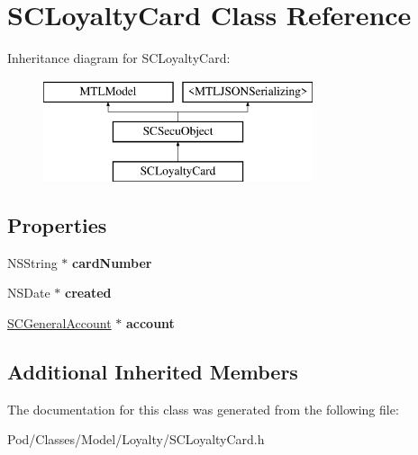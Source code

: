 \hypertarget{interface_s_c_loyalty_card}{}\section{S\+C\+Loyalty\+Card Class Reference}
\label{interface_s_c_loyalty_card}
Inheritance diagram for S\+C\+Loyalty\+Card\+:\begin{figure}[H]
\begin{center}
\leavevmode
\includegraphics[height=3.000000cm]{interface_s_c_loyalty_card}
\end{center}
\end{figure}
\subsection*{Properties}
\begin{DoxyCompactItemize}
\item 
N\+S\+String $\ast$ {\bfseries card\+Number}\hypertarget{interface_s_c_loyalty_card_acfea007a64a5c98cc4292b278973f623}{}\label{interface_s_c_loyalty_card_acfea007a64a5c98cc4292b278973f623}

\item 
N\+S\+Date $\ast$ {\bfseries created}\hypertarget{interface_s_c_loyalty_card_a9a5620b981d3c3cededc5917afce7f97}{}\label{interface_s_c_loyalty_card_a9a5620b981d3c3cededc5917afce7f97}

\item 
\hyperlink{interface_s_c_general_account}{S\+C\+General\+Account} $\ast$ {\bfseries account}\hypertarget{interface_s_c_loyalty_card_ac94e1023463fb722512c4b71332270b3}{}\label{interface_s_c_loyalty_card_ac94e1023463fb722512c4b71332270b3}

\end{DoxyCompactItemize}
\subsection*{Additional Inherited Members}


The documentation for this class was generated from the following file\+:\begin{DoxyCompactItemize}
\item 
Pod/\+Classes/\+Model/\+Loyalty/S\+C\+Loyalty\+Card.\+h\end{DoxyCompactItemize}
